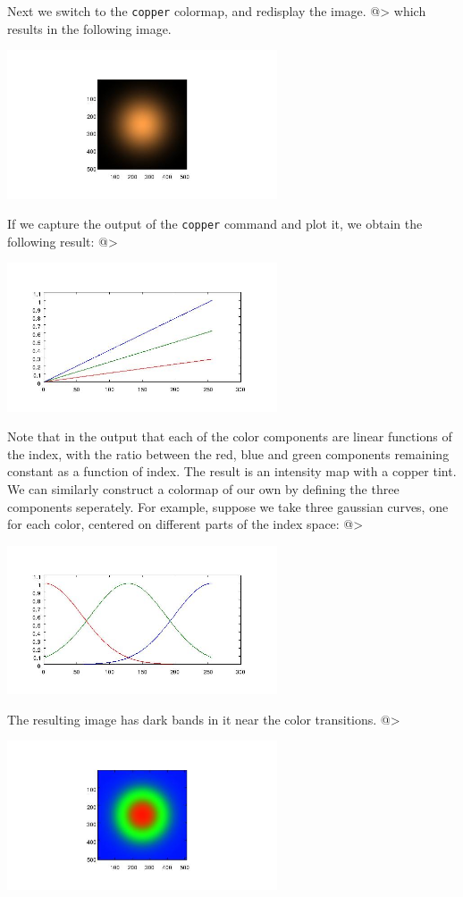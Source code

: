 Next we switch to the \verb|copper| colormap, and redisplay the image.
@>
which results in the following image.


\centerline{\includegraphics[width=8cm]{colormap2}}


If we capture the output of the \verb|copper| command and plot it, we obtain
the following result:
@>


\centerline{\includegraphics[width=8cm]{colormap3}}


Note that in the output that each of the color components are linear functions
of the index, with the ratio between the red, blue and green components remaining
constant as a function of index.  The result is an intensity map with a copper
tint.  We can similarly construct a colormap of our own by defining the 
three components seperately.  For example, suppose we take three gaussian
curves, one for each color, centered on different parts of the index space:
@>


\centerline{\includegraphics[width=8cm]{colormap4}}


The resulting image has dark bands in it near the color transitions.
@>


\centerline{\includegraphics[width=8cm]{colormap5}}


